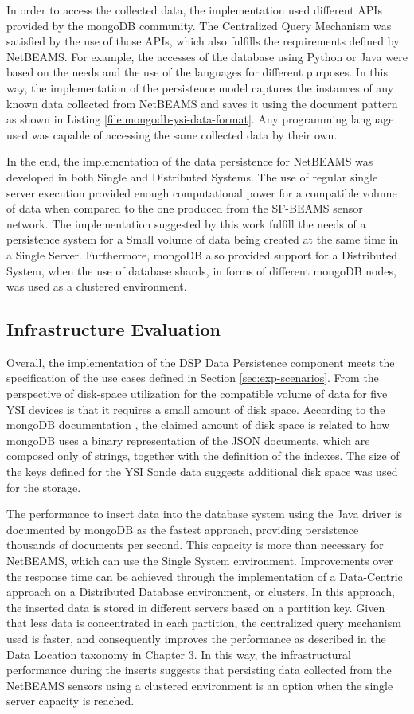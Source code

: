 In order to access the collected data, the implementation used different APIs
provided by the mongoDB community. The Centralized Query Mechanism was
satisfied by the use of those APIs, which also fulfills the requirements
defined by NetBEAMS. For example, the accesses of the database using Python or
Java were based on the needs and the use of the languages for different
purposes. In this way, the implementation of the persistence model captures
the instances of any known data collected from NetBEAMS and saves it using the
document pattern as shown in Listing \ref{file:mongodb-ysi-data-format}. Any
programming language used was capable of accessing the same collected data by
their own. 

In the end, the implementation of the data persistence for NetBEAMS was
developed in both Single and Distributed Systems. The use of regular single
server execution provided enough computational power for a compatible volume of
data when compared to the one produced from the SF-BEAMS sensor network. The
implementation suggested by this work fulfill the needs of a persistence system
for a Small volume of data being created at the same time in a Single Server.
Furthermore, mongoDB also provided support for a Distributed System, when the
use of database shards, in forms of different mongoDB nodes, was used as a 
clustered environment.

\subsection{Infrastructure Evaluation}

Overall, the implementation of the DSP Data Persistence component meets the
specification of the use cases defined in Section \ref{sec:exp-scenarios}.
From the perspective of disk-space utilization for the compatible volume of
data for five YSI devices is that it requires a small amount of disk space.
According to the mongoDB documentation \cite{mongodb}, the claimed amount of
disk space is related to how mongoDB uses a binary representation of the JSON
documents, which are composed only of strings, together with the definition of
the indexes. The size of the keys defined for the YSI Sonde data suggests
additional disk space was used for the storage.

The performance to insert data into the database system using the Java driver
is documented by mongoDB as the fastest approach, providing persistence
thousands of documents per second. This capacity is more than necessary for
NetBEAMS, which can use the Single System environment. Improvements over the
response time can be achieved through the implementation of a Data-Centric
approach on a Distributed Database environment, or clusters. In this approach,
the inserted data is stored in different servers based on a partition key.
Given that less data is concentrated in each partition, the centralized query
mechanism used is faster, and consequently improves the performance as
described in the Data Location taxonomy in Chapter 3. In this way, the
infrastructural performance during the inserts suggests that persisting data
collected from the NetBEAMS sensors using a clustered environment is an option
when the single server capacity is reached.

